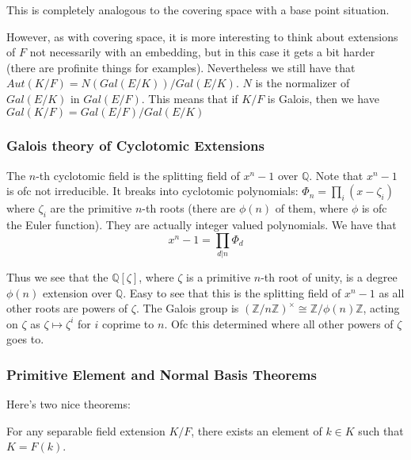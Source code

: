 \documentclass[main.tex]{subfiles}
\begin{document}
\begin{remark}
This is completely analogous to the covering space with a base point situation.
\end{remark}

However, as with covering space, it is more interesting to think about extensions of $F$ not necessarily with an embedding, but in this case it gets a bit harder (there are profinite things for examples). Nevertheless we still have that $Aut (K/F) = N(Gal (E/K))/Gal (E/K)$. $N$ is the normalizer of $Gal(E/K)$ in $Gal(E/F)$. This means that if $K/F$ is Galois, then we have $Gal (K/F) = Gal(E/F) / Gal(E/K)$



\subsubsection{Galois theory of Cyclotomic Extensions}
The $n$-th cyclotomic field is the splitting field of $x^n-1$ over $\mathbb{Q}$. Note that $x^n -1$ is ofc not irreducible. It breaks into cyclotomic polynomials: 
$\Phi_n = \prod_{i} (x - \zeta_i)$ where $\zeta_i$ are the primitive $n$-th roots (there are $\phi(n)$ of them, where $\phi$ is ofc the Euler function). They are actually integer valued polynomials. We have that 
$$
x^n - 1 = \prod_{d | n} \Phi_d
$$

Thus we see that the $\mathbb{Q}[\zeta]$, where $\zeta$ is a primitive $n$-th root of unity,  is a degree $\phi(n)$ extension over $\mathbb{Q}$. Easy to see that this is the splitting field of $x^n -1$ as all other roots are powers of $\zeta$. The Galois group is $(\mathbb{Z}/n\mathbb{Z})^\times \cong \mathbb{Z}/\phi(n)\mathbb{Z}$, acting on $\zeta$ as $\zeta \mapsto \zeta^i$ for $i$ coprime to $n$. Ofc this determined where all other powers of $\zeta$ goes to.

\subsubsection{Primitive Element and Normal Basis Theorems}

Here's two nice theorems:
\begin{theorem}
For any separable field extension $K/F$, there exists an element of $k \in K$ such that $K = F(k)$.
\end{theorem}
\end{document}
